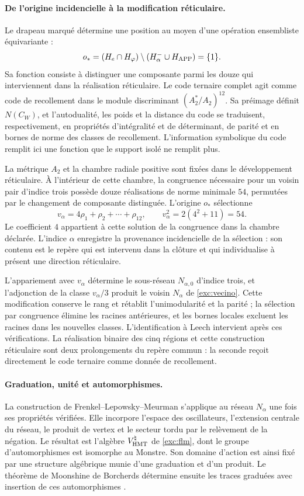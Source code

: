 \paragraph{De l'origine incidencielle à la modification réticulaire.}
\label{inc-ampl-reticulo}
Le drapeau marqué détermine une position au moyen d'une opération
ensembliste équivariante :
\[
 o_*=(H_e\cap H_\varphi)
       \setminus(H^-_\alpha\cup H_{\rm APP})=\{1\}.
\]
Sa fonction consiste à distinguer une composante parmi les douze qui
interviennent dans la réalisation réticulaire. Le code ternaire complet
agit comme code de recollement dans le module discriminant
$(A_2^*/A_2)^{12}$. Sa préimage définit $N(C_W)$, et
l'autodualité, les poids et la distance du code se traduisent,
respectivement, en propriétés d'intégralité et de déterminant, de parité
et en bornes de norme des classes de recollement. L'information symbolique
du code remplit ici une fonction que le support isolé ne remplit plus.

La métrique $A_2$ et la chambre radiale positive sont fixées dans le développement
réticulaire. À l'intérieur de cette chambre, la congruence nécessaire pour un voisin
pair d'indice trois possède douze réalisations de norme minimale $54$,
permutées par le changement de composante distinguée. L'origine $o_*$
sélectionne
\[
 v_\alpha=4\rho_1+\rho_2+\cdots+\rho_{12},\qquad
 v_\alpha^2=2(4^2+11)=54.
\]
Le coefficient $4$ appartient à cette solution de la congruence dans la
chambre déclarée. L'indice $\alpha$ enregistre la provenance
incidencielle de la sélection : son contenu est le repère qui est intervenu dans
la clôture et qui individualise à présent une direction réticulaire.

L'appariement avec $v_\alpha$ détermine le sous-réseau
$N_{\alpha,0}$ d'indice trois, et l'adjonction de la classe
$v_\alpha/3$ produit le voisin $N_\alpha$ de
\eqref{exc:vecino}. Cette modification conserve le rang et rétablit
l'unimodularité et la parité ; la sélection par congruence élimine les racines
antérieures, et les bornes locales excluent les racines dans les nouvelles classes.
L'identification à Leech intervient après ces vérifications. La
réalisation binaire des cinq régions et cette construction réticulaire
sont deux prolongements du repère commun : la seconde reçoit directement
le code ternaire comme donnée de recollement.

\paragraph{Graduation, unité et automorphismes.}
\label{inc-ampl-automorfismos}
La construction de Frenkel--Lepowsky--Meurman s'applique au réseau
$N_\alpha$ une fois ses propriétés vérifiées. Elle incorpore l'espace
des oscillateurs, l'extension centrale du réseau, le produit de vertex
et le secteur tordu par le relèvement de la négation. Le résultat est
l'algèbre $V^\natural_{\rm HMT}$ de \eqref{exc:flm}, dont le groupe
d'automorphismes est isomorphe au Monstre. Son domaine d'action est ainsi
fixé par une structure algébrique munie d'une graduation et d'un produit. Le théorème
de Moonshine de Borcherds détermine ensuite les traces graduées
avec insertion de ces automorphismes \cite{flm,borcherds}.

